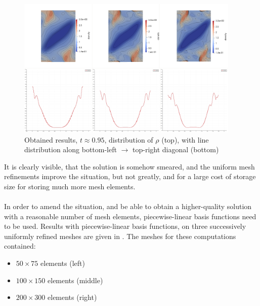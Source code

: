 \begin{figure}[H]
	\begin{center}
		\includegraphics[width=0.95\textwidth]{img/mhd-blast/new/blast,noadapt18.jpg}
	\caption{Obtained results, $t \approx 0.95$, distribution of $\rho$ (top), with line distribution along bottom-left $\rightarrow$ top-right diagonal (bottom)}
	\label{figure:blastNew06}
	\end{center}
\end{figure}
\vspace{-8mm}

It is clearly visible, that the solution is somehow smeared, and the uniform mesh refinements improve the situation, but not greatly, and for a large cost of storage size for storing much more mesh elements.
\paragraph{}
In order to amend the situation, and be able to obtain a higher-quality solution with a reasonable number of mesh elements, piecewise-linear basis functions need to be used. Results with piecewise-linear basis functions, on three successively uniformly refined meshes are given in . The meshes for these computations contained:
\begin{itemize}
\item $50 \times 75$ elements (left)
\item $100 \times 150$ elements (middle)
\item $200 \times 300$ elements (right)
\end{itemize}

